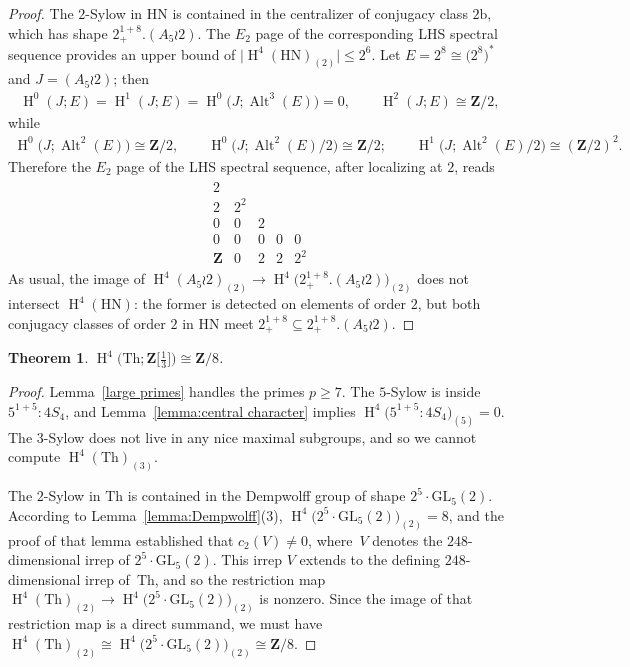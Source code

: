 \documentclass[pdftex]{sigma}
\numberwithin{equation}{section}
\newtheorem{Theorem}{Theorem}[section]
\newcommand\bZ{\mathbf Z}
\newcommand\rb{\mathrm b}
\DeclareMathOperator\homology{H}
\renewcommand\H{\homology}
\newcommand\<\langle
\renewcommand\>\rangle
\DeclareMathOperator\Alt{Alt}
\newcommand{\GL}{\mathrm{GL}}
\begin{document}
\begin{proof}
 The $2$-Sylow in $\mathrm{HN}$ is contained in the centralizer of conjugacy class $2\rb$, which has shape $2^{1+8}_+.(A_5 \wr 2)$. The $E_2$ page of the corresponding LHS spectral sequence provides an upper bound of $\big|\H^4(\mathrm{HN})_{(2)}\big| \leq 2^6$. Let $E = 2^8 \cong \big(2^8\big)^*$ and $J = (A_5 \wr 2)$; then
 \begin{gather*} \H^0(J;E) = \H^1(J;E) = \H^0\big(J; \Alt^3(E)\big) = 0, \qquad \H^2(J;E) \cong \bZ/2,\end{gather*}
 while
 \begin{gather*} \H^0\big(J;\Alt^2(E)\big) \cong \bZ/2, \qquad \H^0\big(J;\Alt^2(E)/2\big) \cong \bZ/2; \qquad \H^1\big(J;\Alt^2(E)/2\big) \cong (\bZ/2)^2. \end{gather*}
 Therefore the $E_2$ page of the LHS spectral sequence, after localizing at $2$, reads
 \begin{gather*} \begin{array}{ccccc}
 2 \\
 2 & 2^2 \\
 0 & 0 & 2 \\
 0 & 0 & 0 & 0 & 0\\
 \bZ & 0 & 2 & 2 & 2^2
 \end{array} \end{gather*}
 As usual, the image of $\H^4(A_5 \wr 2)_{(2)} \to \H^4\big(2^{1+8}_+.(A_5 \wr 2)\big)_{(2)}$ does not intersect $\H^4(\mathrm{HN})$: the former is detected on elements of order $2$, but both conjugacy classes of order $2$ in $\mathrm{HN}$ meet $2^{1+8}_+ \subseteq 2^{1+8}_+.(A_5 \wr 2)$.
\end{proof}

\begin{Theorem} $\H^4\big(\mathrm{Th}; \bZ\big[\frac13\big]\big) \cong \bZ/8$.
\end{Theorem}

\begin{proof}Lemma~\ref{large primes} handles the primes $p\geq 7$. The $5$-Sylow is inside $5^{1+5}:4S_4$, and Lemma~\ref{lemma:central character} implies $\H^4\big(5^{1+5}:4S_4\big)_{(5)} = 0$. The $3$-Sylow does not live in any nice maximal subgroups, and so we cannot compute $\H^4(\mathrm{Th})_{(3)}$.

The $2$-Sylow in $\mathrm{Th}$ is contained in the Dempwolff group of shape $2^5\cdot \GL_5(2)$. According to Lemma~\ref{lemma:Dempwolff}(3), $\H^4\big(2^5\cdot \GL_5(2)\big)_{(2)} = 8$, and the proof of that lemma established that $c_2(V) \neq 0$, where~$V$ denotes the $248$-dimensional irrep of $2^5\cdot \GL_5(2)$. This irrep $V$ extends to the defining $248$-dimensional irrep of~$\mathrm{Th}$, and so the restriction map $\H^4(\mathrm{Th})_{(2)} \to \H^4\big(2^5\cdot \GL_5(2)\big)_{(2)}$ is nonzero. Since the image of that restriction map is a direct summand, we must have $\H^4(\mathrm{Th})_{(2)} \cong \H^4\big(2^5\cdot \GL_5(2)\big)_{(2)} \cong \bZ/8$.
\end{proof}
\end{document}
